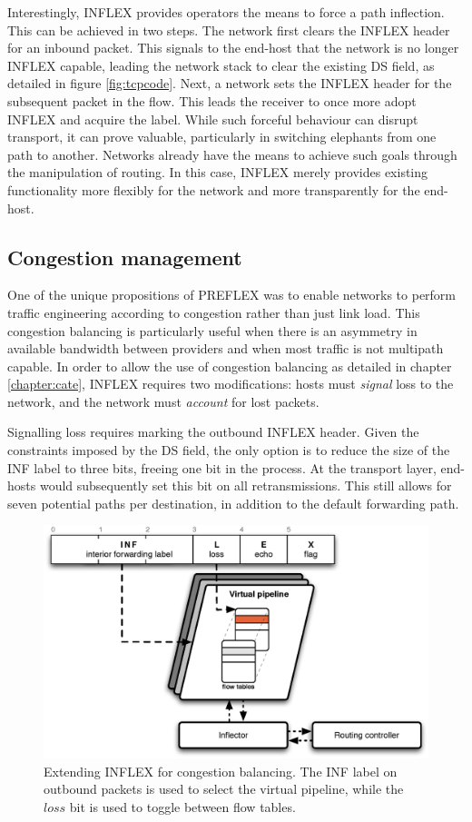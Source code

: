 Interestingly, INFLEX provides operators the means to force a path inflection.
This can be achieved in two steps.
The network first clears the INFLEX header for an inbound packet. 
This signals to the end-host that the network is no longer INFLEX capable, leading the network stack to clear the existing \ac{DS} field, as detailed in figure \ref{fig:tcpcode}.
Next, a network sets the INFLEX header for the subsequent packet in the flow.
This leads the receiver to once more adopt INFLEX and acquire the label.
While such forceful behaviour can disrupt transport, it can prove valuable, particularly in switching elephants from one path to another.
Networks already have the means to achieve such goals through the manipulation of routing.
In this case, INFLEX merely provides existing functionality more flexibly for the network and more transparently for the end-host.

\subsection{Congestion management}

One of the unique propositions of \ac{PREFLEX} was to enable networks to perform traffic engineering according to congestion rather than just link load.
This congestion balancing is particularly useful when there is an asymmetry in available bandwidth between providers and when most traffic is not multipath capable.
In order to allow the use of congestion balancing as detailed in chapter \ref{chapter:cate}, INFLEX requires two modifications: hosts must \emph{signal} loss to the network, and the network must \emph{account} for lost packets.

Signalling loss requires marking the outbound INFLEX header.
Given the constraints imposed by the \ac{DS} field, the only option is to reduce the size of the \ac{INF} label to three bits, freeing one bit in the process.
At the transport layer, end-hosts would subsequently set this bit on all retransmissions.
This still allows for seven potential paths per destination, in addition to the default forwarding path.

\begin{figure}
    \centering
    \includegraphics[width=0.7\linewidth]{figures/inflex/infloss}
    \caption[Extending INFLEX for congestion balancing.]{Extending INFLEX for congestion balancing. The \ac{INF} label on outbound packets is used to select the virtual pipeline, while the $loss$ bit is used to toggle between flow tables.\label{fig:inflexloss}}
\end{figure}

